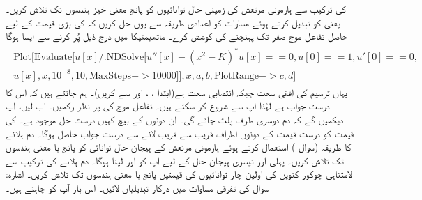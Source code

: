  کی ترکیب سے ہارمونی مرتعش کی زمینی حال توانائیوں کو پانچ معنی خیز ہندسوں تک تلاش کریں۔ یعنی  کو تبدیل کرتے ہوئے مساوات  کو اعدادی طریقہ سے یوں حل کریں کہ  کی بڑی قیمت کے لیے حاصل تفاعل موج صفر تک پہنچنے کی کوشش کرے۔ ماتھیمٹیکا میں درج ذیل پُر کرنے سے ایسا ہوگا
\begin{gather*}
\begin{aligned}
	\text{Plot}[\text{Evaluate}[u[x]/.\text{NDSolve}[{u''[x]-(x^2-K)^*u[x]==0, u[0]==1, u'[0]==0},\\
	u[x],{x, 10^{-8}, 10}, \text{MaxSteps}->\num{10000}]], {x, a, b}, \text{PlotRange}->{c, d}]
\end{aligned}
\end{gather*}
یہاں  ترسیم کی افقی سعت  جبکہ  انتصابی سعت ہے(ابتدا ، ، اور  سے کریں)۔ ہم جانتے ہیں کہ اس کا درست جواب  ہے لہٰذا آپ  سے شروع کر سکتے ہیں۔ تفاعل موج کی  پر نظر رکھیں۔ اب  لیں، آپ دیکھیں گے کہ دم دوسری طرف پلٹ جائے گی۔ ان دونوں کے بیچ کہیں درست حل موجود ہے۔  کی قیمت کو درست قیمت کے دونوں اطراف قریب سے قریب لانے سے درست جواب حاصل ہوگا۔
دم ہلانے کا طریقہ (سوال ) استعمال کرتے ہوئے ہارمونی مرتعش کے ہیجان حال توانائی کو پانچ با معنی ہندسوں تک تلاش کریں۔ پہلی اور تیسری ہیجان حال کے لیے آپ کو  اور  لینا ہوگا۔
دم ہلانے کی ترکیب سے لامتناہی چوکور کنویں  کی اولین چار توانائیوں کی قیمتیں پانچ با معنی ہندسوں تک تلاش کریں۔ اشارہ: سوال   کی تفرقی مساوات میں درکار تبدیلیاں لائیں۔ اس بار آپ کو چاہتے ہیں۔

